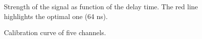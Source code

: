 \begin{figure}[H]
	\centering
	\caption{Strength of the signal as function of the delay time. The red line highlights the optimal one (64 ns).}
	\label{fig:optdelay}
\end{figure}

\begin{figure}[H]
	\centering
	\caption{Calibration curve of five channels.}
	\label{fig:calibmeas}
\end{figure}

